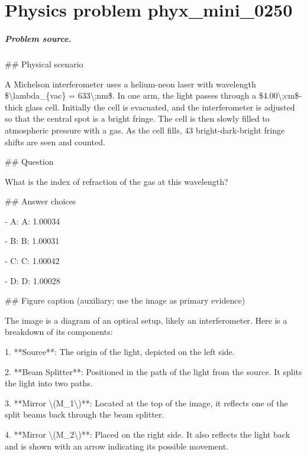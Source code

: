 
\chapter{Physics problem phyx\_mini\_0250}
\label{ch:PhyXMiniProblems_problem_phyx_mini_0250}

\paragraph{Problem source.}
\#\# Physical scenario

A Michelson interferometer uses a helium-neon laser with wavelength \$\textbackslash{}lambda\_\{vac\} = 633\textbackslash{};nm\$. In one arm, the light passes through a \$4.00\textbackslash{};cm\$-thick glass cell. Initially the cell is evacuated, and the interferometer is adjusted so that the central spot is a bright fringe. The cell is then slowly filled to atmospheric pressure with a gas. As the cell fills, 43 bright-dark-bright fringe shifts are seen and counted.

\#\# Question

What is the index of refraction of the gas at this wavelength?

\#\# Answer choices

- A: A: 1.00034

- B: B: 1.00031

- C: C: 1.00042

- D: D: 1.00028

\#\# Figure caption (auxiliary; use the image as primary evidence)

The image is a diagram of an optical setup, likely an interferometer. Here is a breakdown of its components:

1. **Source**: The origin of the light, depicted on the left side.

2. **Beam Splitter**: Positioned in the path of the light from the source. It splits the light into two paths.

3. **Mirror \textbackslash{}(M\_1\textbackslash{})**: Located at the top of the image, it reflects one of the split beams back through the beam splitter.

4. **Mirror \textbackslash{}(M\_2\textbackslash{})**: Placed on the right side. It also reflects the light back and is shown with an arrow indicating its possible movement.

